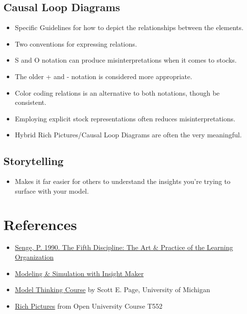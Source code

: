 \documentclass[]{memoir}
\begin{document}
\subsection{Causal Loop Diagrams}

\begin{itemize}
\itemsep1pt\parskip0pt
\item
  Specific Guidelines for how to depict the relationships between the
  elements.
\item
  Two conventions for expressing relations.
\item
  S and O notation can produce misinterpretations when it comes to
  stocks.
\item
  The older + and - notation is considered more appropriate.
\item
  Color coding relations is an alternative to both notations, though be
  consistent.
\item
  Employing explicit stock representations often reduces
  misinterpretations.
\item
  Hybrid Rich Pictures/Causal Loop Diagrams are often the very
  meaningful.
\end{itemize}

\subsection{Storytelling}

\begin{itemize}
\itemsep1pt\parskip0pt
\item
  Makes it far easier for others to understand the insights you're
  trying to surface with your model.
\end{itemize}

\section{References}

\begin{itemize}
\itemsep1pt\parskip0pt
\item
  \href{http://www.amazon.com/Fifth-Discipline-Practice-Organization-ebook/dp/B000SEIFKK/}{Senge,
  P. 1990. The Fifth Discipline: The Art \& Practice of the Learning
  Organization}
\item
  \href{http://www.systemswiki.org/index.php?title=Modeling_\%26_Simulation_with_Insight_Maker}{Modeling
  \& Simulation with Insight Maker}
\item
  \href{https://www.coursera.org/course/modelthinking}{Model Thinking
  Course} by Scott E. Page, University of Michigan
\item
  \href{http://systems.open.ac.uk/materials/T552/pages/rich/richAppendix.html}{Rich
  Pictures} from Open University Course T552
\end{itemize}
\end{document}
